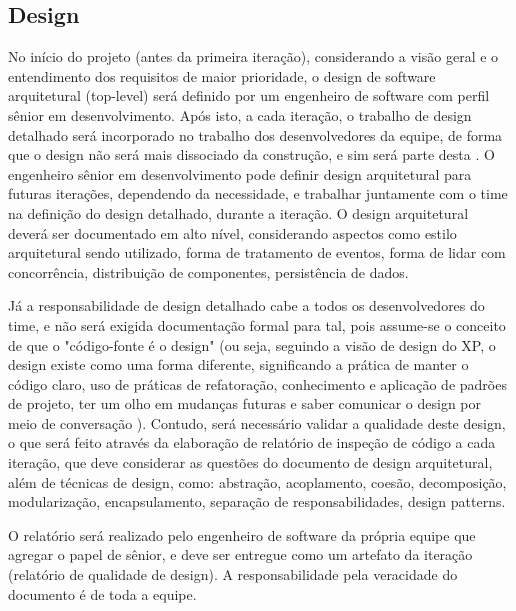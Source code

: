 \documentclass[12pt,journal,compsoc]{IEEEtran}
\begin{document}
\subsection{Design}

No início do projeto (antes da primeira iteração), considerando a visão geral e
o entendimento dos requisitos de maior prioridade, o design de software
arquitetural (top-level) \cite{society_software_2004} será definido por um %
engenheiro de software com perfil sênior em desenvolvimento. Após isto, a cada
iteração, o trabalho de design detalhado será incorporado no trabalho dos
desenvolvedores da equipe, de forma que o design não será mais dissociado da
construção, e sim será parte desta \cite{fowler_planned_evolutionary_design}. O
engenheiro sênior em desenvolvimento pode definir design arquitetural para
futuras iterações, dependendo da necessidade, e trabalhar juntamente com o time
na definição do design detalhado, durante a iteração. O design arquitetural
deverá ser documentado em alto nível, considerando aspectos como estilo
arquitetural sendo utilizado, forma de tratamento de eventos, forma de lidar
com concorrência, distribuição de componentes, persistência de dados.

Já a responsabilidade de design detalhado cabe a todos os desenvolvedores do time, e não será exigida documentação formal para tal, pois assume-se o conceito de que o "código-fonte é o design" (ou seja, seguindo a visão de design do XP, o design existe como uma forma diferente, significando a prática de manter o código claro, uso de práticas de refatoração, conhecimento e aplicação de padrões de projeto, ter um olho em mudanças futuras e saber comunicar o design por meio de conversação \cite{fowler_design_dead}). Contudo, será necessário validar a qualidade deste design, o que será feito através da elaboração de relatório de inspeção de código a cada iteração, que deve considerar as questões do documento de design arquitetural, além de técnicas de design, como: abstração, acoplamento, coesão, decomposição, modularização, encapsulamento, separação de responsabilidades, design patterns. 

O relatório será realizado pelo engenheiro de software da própria equipe que agregar o papel de sênior, e deve ser entregue como um artefato da iteração (relatório de qualidade de design). A responsabilidade pela veracidade do documento é de toda a equipe.
\end{document}
